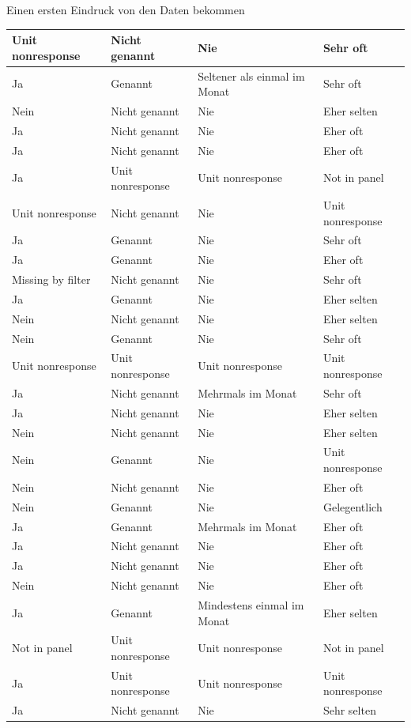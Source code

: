 \documentclass[ignorenonframetext,]{beamer}
\begin{document}
\begin{frame}{Einen ersten Eindruck von den Daten bekommen}
\begin{tabular}{l|l|l|l}
\hline
Unit nonresponse & Nicht genannt & Nie & Sehr oft\\
\hline
Ja & Genannt & Seltener als einmal im Monat & Sehr oft\\
\hline
Nein & Nicht genannt & Nie & Eher selten\\
\hline
Ja & Nicht genannt & Nie & Eher oft\\
\hline
Ja & Nicht genannt & Nie & Eher oft\\
\hline
Ja & Unit nonresponse & Unit nonresponse & Not in panel\\
\hline
Unit nonresponse & Nicht genannt & Nie & Unit nonresponse\\
\hline
Ja & Genannt & Nie & Sehr oft\\
\hline
Ja & Genannt & Nie & Eher oft\\
\hline
Missing by filter & Nicht genannt & Nie & Sehr oft\\
\hline
Ja & Genannt & Nie & Eher selten\\
\hline
Nein & Nicht genannt & Nie & Eher selten\\
\hline
Nein & Genannt & Nie & Sehr oft\\
\hline
Unit nonresponse & Unit nonresponse & Unit nonresponse & Unit nonresponse\\
\hline
Ja & Nicht genannt & Mehrmals im Monat & Sehr oft\\
\hline
Ja & Nicht genannt & Nie & Eher selten\\
\hline
Nein & Nicht genannt & Nie & Eher selten\\
\hline
Nein & Genannt & Nie & Unit nonresponse\\
\hline
Nein & Nicht genannt & Nie & Eher oft\\
\hline
Nein & Genannt & Nie & Gelegentlich\\
\hline
Ja & Genannt & Mehrmals im Monat & Eher oft\\
\hline
Ja & Nicht genannt & Nie & Eher oft\\
\hline
Ja & Nicht genannt & Nie & Eher oft\\
\hline
Nein & Nicht genannt & Nie & Eher oft\\
\hline
Ja & Genannt & Mindestens einmal im Monat & Eher selten\\
\hline
Not in panel & Unit nonresponse & Unit nonresponse & Not in panel\\
\hline
Ja & Unit nonresponse & Unit nonresponse & Unit nonresponse\\
\hline
Ja & Nicht genannt & Nie & Sehr selten\\

\end{tabular}
\end{frame}
\end{document}
